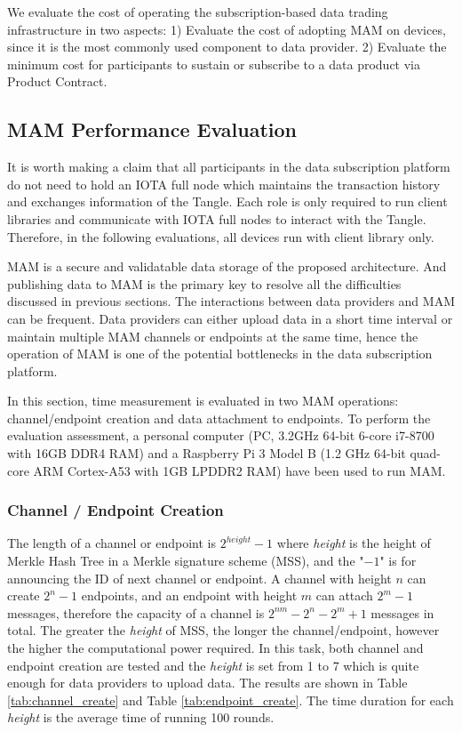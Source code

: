 \begin{spacing}{2.0}
\label{section:evaluation}
We evaluate the cost of operating the subscription-based data trading infrastructure in two aspects: 1) Evaluate the cost of adopting MAM on devices, since it is the most commonly used component to data provider. 2) Evaluate the minimum cost for participants to sustain or subscribe to a data product via Product Contract.

\subsection{MAM Performance Evaluation}
\label{section:mam_performance}
It is worth making a claim that all participants in the data subscription platform do not need to hold an IOTA full node which maintains the transaction history and exchanges information of the Tangle. Each role is only required to run client libraries and communicate with IOTA full nodes to interact with the Tangle. Therefore, in the following evaluations, all devices run with client library only.

MAM is a secure and validatable data storage of the proposed architecture. And publishing data to MAM is the primary key to resolve all the difficulties discussed in previous sections. The interactions between data providers and MAM can be frequent. Data providers can either upload data in a short time interval or maintain multiple MAM channels or endpoints at the same time, hence the operation of MAM is one of the potential bottlenecks in the data subscription platform.

In this section, time measurement is evaluated in two MAM operations: channel/endpoint creation and data attachment to endpoints. To perform the evaluation assessment, a personal computer (PC, 3.2GHz 64-bit 6-core i7-8700 with 16GB DDR4 RAM) and a Raspberry Pi 3 Model B (1.2 GHz 64-bit quad-core ARM Cortex-A53 with 1GB LPDDR2 RAM) have been used to run MAM.

\subsubsection{Channel / Endpoint Creation}
The length of a channel or endpoint is $2^{height}-1$ where \textit{height} is the height of Merkle Hash Tree in a Merkle signature scheme (MSS), and the "$-1$" is for announcing the ID of next channel or endpoint. A channel with height $n$ can create $2^n-1$ endpoints, and an endpoint with height $m$ can attach $2^m-1$ messages, therefore the capacity of a channel is $2^{nm}-2^n-2^m+1$ messages in total. The greater the \textit{height} of MSS, the longer the channel/endpoint, however the higher the computational power required. In this task, both channel and endpoint creation are tested and the \textit{height} is set from 1 to 7 which is quite enough for data providers to upload data. The results are shown in Table \ref{tab:channel_create} and Table \ref{tab:endpoint_create}. The time duration for each \textit{height} is the average time of running 100 rounds.


\end{spacing}
